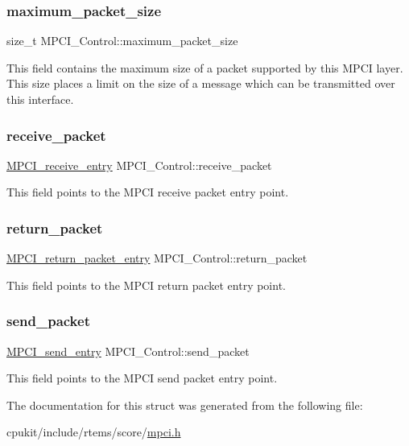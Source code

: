 \subsubsection{\texorpdfstring{maximum\_packet\_size}{maximum\_packet\_size}}
{\footnotesize\ttfamily size\+\_\+t M\+P\+C\+I\+\_\+\+Control\+::maximum\+\_\+packet\+\_\+size}

This field contains the maximum size of a packet supported by this M\+P\+CI layer. This size places a limit on the size of a message which can be transmitted over this interface. \mbox{\label{structMPCI__Control_a917655da0f5bbead19596cc0e3388545}} 
\subsubsection{\texorpdfstring{receive\_packet}{receive\_packet}}
{\footnotesize\ttfamily \mbox{\hyperlink{group__RTEMSScoreMPCI_ga87bfcaa7cd058fd748d6f4b7f530448b}{M\+P\+C\+I\+\_\+receive\+\_\+entry}} M\+P\+C\+I\+\_\+\+Control\+::receive\+\_\+packet}

This field points to the M\+P\+CI receive packet entry point. \mbox{\label{structMPCI__Control_a4830b90775aec0a366c007a5dc106654}} 
\subsubsection{\texorpdfstring{return\_packet}{return\_packet}}
{\footnotesize\ttfamily \mbox{\hyperlink{group__RTEMSScoreMPCI_gaa1869d09a5e31b0810c9efda6171ffa4}{M\+P\+C\+I\+\_\+return\+\_\+packet\+\_\+entry}} M\+P\+C\+I\+\_\+\+Control\+::return\+\_\+packet}

This field points to the M\+P\+CI return packet entry point. \mbox{\label{structMPCI__Control_aafd1390d1aa6de603ecdeaa622917e64}} 
\subsubsection{\texorpdfstring{send\_packet}{send\_packet}}
{\footnotesize\ttfamily \mbox{\hyperlink{group__RTEMSScoreMPCI_gaeacb0c0d07a93283f07abcc5727a23a8}{M\+P\+C\+I\+\_\+send\+\_\+entry}} M\+P\+C\+I\+\_\+\+Control\+::send\+\_\+packet}

This field points to the M\+P\+CI send packet entry point. 

The documentation for this struct was generated from the following file\+:\begin{DoxyCompactItemize}
\item 
cpukit/include/rtems/score/\mbox{\hyperlink{cpukit_2include_2rtems_2score_2mpci_8h}{mpci.\+h}}\end{DoxyCompactItemize}

